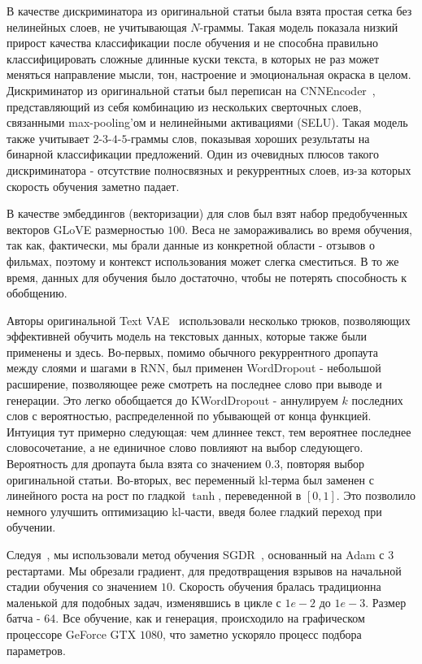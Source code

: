\documentclass{spbau-diploma}
\begin{document}
В качестве дискриминатора из оригинальной статьи была взята простая сетка без
нелинейных слоев, не учитывающая $N$-граммы. Такая модель показала низкий 
прирост качества классификации после обучения и не способна правильно 
классифицировать сложные длинные куски текста, в которых не раз может меняться
направление мысли, тон, настроение и эмоциональная окраска в целом.
Дискриминатор из оригинальной статьи был переписан на 
CNNEncoder~\cite{1510.03820}, представляющий из себя комбинацию из нескольких 
сверточных слоев, связанными max-pooling'ом и нелинейными активациями (SELU). 
Такая модель также учитывает $2$-$3$-$4$-$5$-граммы слов, показывая хороших 
результаты на бинарной классификации предложений. Один из очевидных плюсов 
такого дискриминатора - отсутствие полносвязных и рекуррентных слоев, из-за 
которых скорость обучения заметно падает.

В качестве эмбеддингов (векторизации) для слов был взят набор предобученных
векторов GLoVE размерностью $100$. Веса не замораживались во время обучения,
так как, фактически, мы брали данные из конкретной области - отзывов о фильмах,
поэтому и контекст использования может слегка сместиться. В то же время, данных
для обучения было достаточно, чтобы не потерять способность к обобщению.

Авторы оригинальной Text VAE~\cite{text_vae} использовали несколько трюков, 
позволяющих эффективней обучить модель на текстовых данных, которые также были 
применены и здесь. Во-первых, помимо обычного рекуррентного 
дропаута~\cite{wiki:dropout} между слоями и шагами в RNN, был применен 
WordDropout - небольшой расширение, позволяющее реже смотреть на последнее 
слово при выводе и генерации. Это легко обобщается до KWordDropout - аннулируем
$k$ последних слов с вероятностью, распределенной по убывающей от конца 
функцией. Интуиция тут примерно следующая: чем длиннее текст, тем вероятнее 
последнее словосочетание, а не единичное слово повлияют на выбор следующего. 
Вероятность для дропаута была взята со значением $0.3$, повторяя выбор 
оригинальной статьи. Во-вторых, вес переменный kl-терма был заменен с 
линейного роста на рост по гладкой $\tanh$, переведенной в $[0, 1]$. Это 
позволило немного улучшить оптимизацию kl-части, введя более гладкий переход 
при обучении.

Следуя~\cite{fastai}, мы использовали метод обучения 
SGDR~\cite{1608.03983}, основанный на Adam с $3$ рестартами. Мы обрезали 
градиент, для предотвращения взрывов на начальной стадии обучения со значением
$10$. Скорость обучения бралась традиционна маленькой для подобных задач, 
изменявшись в цикле с $1e-2$ до $1e-3$. Размер батча - $64$. Все обучение, как 
и генерация, происходило на графическом процессоре GeForce GTX $1080$, что
заметно ускоряло процесс подбора параметров.
\end{document}
